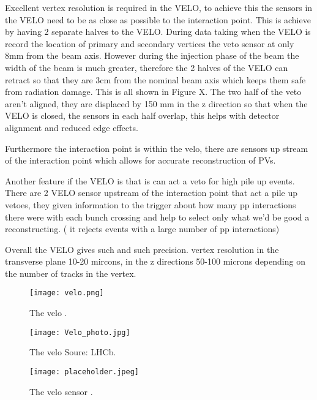Excellent vertex resolution is required in the VELO, to achieve this the sensors in the VELO need to be as close as possible to the interaction point. This is achieve by having 2 separate halves to the VELO. During data taking when the VELO is record the location of primary and secondary vertices the veto sensor at only 8mm from the beam axis. However during the injection phase of the beam the width of the beam is much greater, therefore the 2 halves of the VELO can retract so that they are 3cm from the nominal beam axis which keeps them safe from radiation damage. This is all shown in Figure X. The two half of the veto aren’t aligned, they are displaced by 150 mm in the z direction so that when the VELO is closed, the sensors in each half overlap, this helps with detector alignment and reduced edge effects.


Furthermore the interaction point is within the velo, there are sensors up stream of the interaction point which allows for accurate reconstruction of PVs.


Another feature if the VELO is that is can act a veto for high pile up events. There are 2 VELO sensor upstream of the interaction point that act a pile up vetoes, they given information to the trigger about how many pp interactions there were with each bunch crossing and help to select only what we’d be good a reconstructing. ( it rejects events with a large number of pp interactions)

Overall the VELO gives such and such precision.  vertex resolution in the transverse plane 10-20 mircons, in the z directions 50-100 microns depending on the number of tracks in the vertex. %


\begin{figure}[tb] 
  \centering    
  \texttt{[image: velo.png]}
  \caption{The velo \cite{Alves:2008zz}.}
  \label{fig:velo}
\end{figure}

\begin{figure}[tb] 
  \centering    
  \texttt{[image: Velo\_photo.jpg]}
  \caption{The velo Soure: LHCb.}
  \label{fig:velo_photo}
\end{figure}

\begin{figure}[tb] 
  \centering    
  \texttt{[image: placeholder.jpeg]}
  \caption{The velo sensor \cite{Alves:2008zz}.}
  \label{fig:velo_sensor}
\end{figure}

